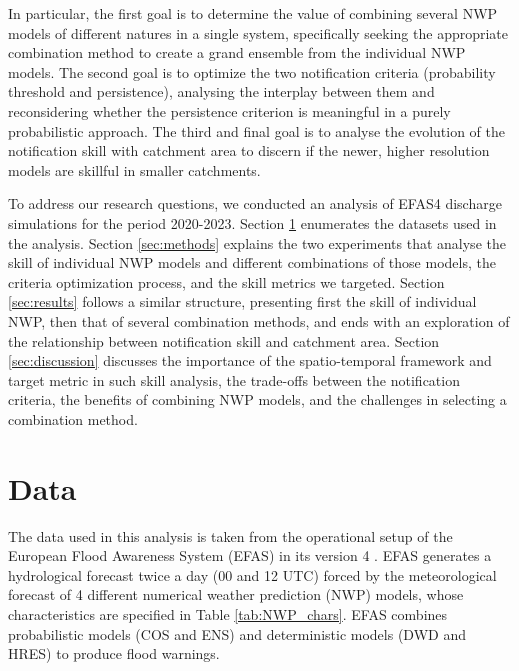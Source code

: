 \documentclass[preprint,12pt,authoryear]{elsarticle}
\begin{document}
In particular, the first goal is to determine the value of combining several NWP models of different natures in a single system, specifically seeking the appropriate combination method to create a grand ensemble from the individual NWP models. The second goal is to optimize the two notification criteria (probability threshold and persistence), analysing the interplay between them and reconsidering whether the persistence criterion is meaningful in a purely probabilistic approach. The third and final goal is to analyse the evolution of the notification skill with catchment area to discern if the newer, higher resolution models are skillful in smaller catchments.

To address our research questions, we conducted an analysis of  EFAS4 discharge simulations for the period 2020-2023. Section \ref{sec:data} enumerates the datasets used in the analysis. Section \ref{sec:methods} explains the two experiments that analyse the skill of individual NWP models and different combinations of those models, the criteria optimization process, and the skill metrics we targeted. Section \ref{sec:results} follows a similar structure, presenting first the skill of individual NWP, then that of several combination methods, and ends with an exploration of the relationship between notification skill and catchment area. Section \ref{sec:discussion} discusses the importance of the spatio-temporal framework and target metric in such skill analysis, the trade-offs between the notification criteria, the benefits of combining NWP models, and the challenges in selecting a combination method.

\section{Data}
\label{sec:data}

The data used in this analysis is taken from the operational setup of the European Flood Awareness  System (EFAS) in its version 4 \cite{EFASv4.0}. EFAS generates a hydrological forecast twice a day (00 and 12 UTC) forced by the meteorological forecast of 4 different numerical weather prediction (NWP) models, whose characteristics are specified in Table \ref{tab:NWP_chars}. EFAS combines probabilistic models (COS and ENS) and deterministic models (DWD and HRES) to produce flood warnings.
\end{document}
